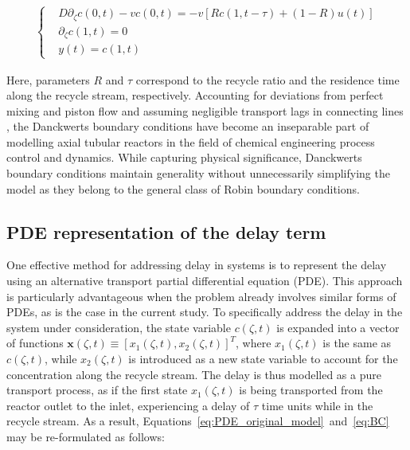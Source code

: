 \begin{align} \label{eq:BC}
    \begin{cases}
        &D \partial_\zeta c(0, t) - v c(0, t) = -v \left[ R c(1, t-\tau) + (1-R) u(t) \right] \\
        &\partial_\zeta c(1, t) = 0 \\
        &y(t) = c(1, t)
    \end{cases}
\end{align}

Here, parameters $R$ and $\tau$ correspond to the recycle ratio and the residence time along the recycle stream, respectively. Accounting for deviations from perfect mixing and piston flow and assuming negligible transport lags in connecting lines \autocite{danckwerts1993continuous}, the Danckwerts boundary conditions have become an inseparable part of modelling axial tubular reactors in the field of chemical engineering process control and dynamics. While capturing physical significance, Danckwerts boundary conditions maintain generality without unnecessarily simplifying the model as they belong to the general class of Robin boundary conditions.


\subsection{PDE representation of the delay term}

One effective method for addressing delay in systems is to represent the delay using an alternative transport partial differential equation (PDE). This approach is particularly advantageous when the problem already involves similar forms of PDEs, as is the case in the current study. To specifically address the delay in the system under consideration, the state variable $c(\zeta, t)$ is expanded into a vector of functions $\bm{x}(\zeta, t) \equiv [x_1(\zeta, t), x_2(\zeta, t)]^T$, where $x_1(\zeta, t)$ is the same as $c(\zeta, t)$, while $x_2(\zeta, t)$ is introduced as a new state variable to account for the concentration along the recycle stream. The delay is thus modelled as a pure transport process, as if the first state $x_1(\zeta, t)$ is being transported from the reactor outlet to the inlet, experiencing a delay of $\tau$ time units while in the recycle stream. As a result, Equations~\ref{eq:PDE_original_model}~and~\ref{eq:BC} may be re-formulated as follows:

